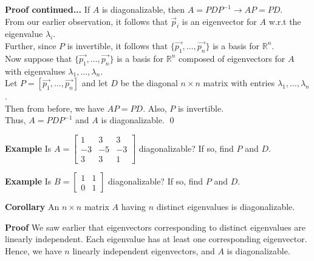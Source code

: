  \begin{frame}[fragile]
\textbf{Proof continued...}
If $A$ is diagonalizable, then $A=PDP^{-1}\rightarrow AP=PD$.  \\ 
From our earlier observation, it follows that $\vec{p}_i$ is an eigenvector for $A$ w.r.t the eigenvalue $\lambda_i$.  \\ 
Further, since $P$ is invertible, it follows that $\{\vec{p_1},\dots, \vec{p_n}\}$ is a basis for $\mathbb R^n$.  \\ 

Now suppose that $\{\vec{p_1},\dots, \vec{p_n}\}$ is a basis for $\mathbb R^n$ composed of eigenvectors for $A$ with eigenvalues $\lambda_1, \dots, \lambda_n$.  \\ 
Let $P=[\vec{p_1},\dots, \vec{p_n}]$ and let $D$ be the diagonal $n\times n$ matrix with entries $\lambda_1, \dots, \lambda_n$.  \\ 
Then from before, we have $AP=PD$.  Also, $P$ is invertible.  \\ 
Thus, $A=PDP^{-1}$ and $A$ is diagonalizable.  \qed

\end{frame}





 \begin{frame}[fragile]

\textbf{Example}
Is $A=\left[\begin{array}{rrr} 1&3&3\\ -3&-5&-3\\3&3&1\end{array}\right]$ diagonalizable?  If so, find $P$ and $D$.

\textbf{Example}
Is $B=\left[\begin{array}{rr} 1&1\\0&1\end{array}\right]$ diagonalizable?  If so, find $P$ and $D$.

\end{frame}





 \begin{frame}[fragile]
\textbf{Corollary}  
An $n\times n$ matrix $A$ having $n$ distinct eigenvalues is diagonalizable.
 
\textbf{Proof}
We saw earlier that eigenvectors corresponding to distinct eigenvalues
are linearly independent.  Each eigenvalue has at least one corresponding eigenvector.
Hence, we have $n$ linearly independent eigenvectors, and $A$ is diagonalizable.

\end{frame}





